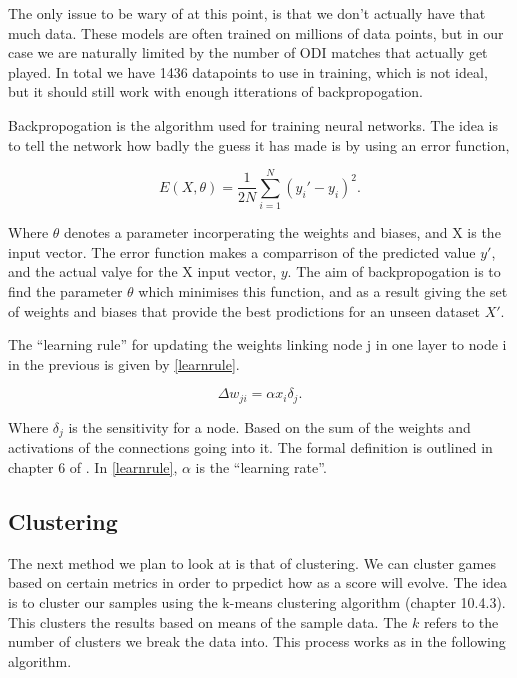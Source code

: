 \documentclass[11pt]{amsart}
\begin{document}
The only issue to be wary of at this point, is that we don't actually have that much data. These models are often trained on millions of data points, but in our case we are naturally 
limited by the number of ODI matches that actually get played. In total we have 1436 datapoints to use in training, which is not ideal, but it should still work with enough itterations of backpropogation.

Backpropogation is the algorithm used for training neural networks. The idea is to tell the network how badly the guess it has made is by using an error function,

\begin{equation}
    E(X,\theta) = \frac{1}{2N}\sum^N_{i=1}(y_i'-y_i)^2.
\end{equation}

Where $\theta$ denotes a parameter incorperating the weights and biases, and X is the input vector. The error function makes a comparrison of the predicted value $y'$, and the actual
valye for the X input vector, $y$. The aim of backpropogation is to find the parameter $\theta$ which minimises this function, and as a result
giving the set of weights and biases that provide the best prodictions for an unseen dataset $X'$. 

The ``learning rule'' for updating the weights linking node j in one layer to node i in the previous is given by \ref{learnrule}.

\begin{equation}
    \label{learnrule}
    \Delta w_{ji} = \alpha x_i \delta_j.
\end{equation}

Where $\delta_j$ is the sensitivity for a node. Based on the sum of the weights and activations of the connections going into it. The formal definition is
outlined in chapter 6 of \cite{Duda}. In \ref{learnrule}, $\alpha$ is the ``learning rate''. 

\subsection{Clustering}
The next method we plan to look at is that of clustering. We can cluster games based on certain metrics in order to prpedict how as a score will evolve.
The idea is to cluster our samples using the k-means clustering algorithm \cite{Duda} (chapter 10.4.3). This clusters the results 
based on means of the sample data. The $k$ refers to the number of clusters we break the data into. This process works as in the following algorithm. \\
\end{document}
